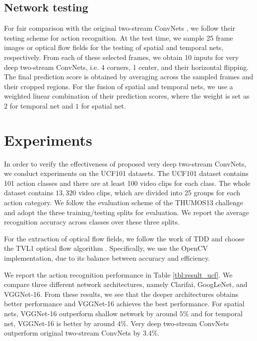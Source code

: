 \documentclass[10pt,twocolumn,letterpaper]{article}
\begin{document}
\subsection{Network testing}

For fair comparison with the original two-stream ConvNets \cite{SimonyanZ14}, we follow their testing scheme for action recognition. At the test time, we sample 25 frame images or optical flow fields for the testing of spatial and temporal nets, respectively. From each of these selected frames, we obtain 10 inputs for very deep two-stream ConvNets, i.e. 4 corners, 1 center, and their horizontal flipping. The final prediction score is obtained by averaging across the sampled frames and their cropped regions. For the fusion of spatial and temporal nets, we use a weighted linear combination of their prediction scores, where the weight is set as $2$ for temporal net and $1$ for spatial net.

\section{Experiments}
\label{sec:experiment}

In order to verify the effectiveness of proposed very deep two-stream ConvNets, we conduct experiments on the UCF101 \cite{Soomro12} datasets. The UCF101 dataset contains 101 action classes and there are at least 100 video clips for each class. The whole dataset contains $13,320$ video clips, which are divided into 25 groups for each action category. We follow the evaluation scheme of the THUMOS13 challenge \cite{THUMOS13} and adopt the three training/testing splits for evaluation. We report the average recognition accuracy across classes over these three splits.

For the extraction of optical flow fields, we follow the work of TDD \cite{WangQT15a} and choose the TVL1 optical flow algorithm \cite{ZachPB07}. Specifically, we use the OpenCV implementation, due to its balance between accuracy and efficiency.

We report the action recognition performance in Table \ref{tbl:result_ucf}. We compare three different network architectures, namely Clarifai, GoogLeNet, and VGGNet-16. From these results, we see that the deeper architectures obtains better performance and VGGNet-16 achieves the best performance. For spatial nets, VGGNet-16 outperform shallow network by around $5\%$ and for temporal net, VGGNet-16 is better by around $4\%$. Very deep two-stream ConvNets outperform original two-stream ConvNets by $3.4\%$. 
\end{document}
